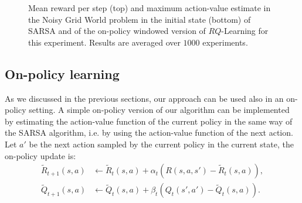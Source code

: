 \begin{figure}[t]
\begin{minipage}{\columnwidth}
\end{minipage}
  \caption[Grid World with Holes algorithms comparison - 2]{Mean reward per step (top) and maximum action-value estimate in the Noisy Grid World problem in the initial state (bottom) of SARSA and of the on-policy windowed version of $RQ$-Learning for this experiment. Results are averaged over $1000$ experiments.}
  \label{F:sarsa}
\end{figure}

\subsection{On-policy learning}
As we discussed in the previous sections, our approach can be used also in an on-policy setting. A simple on-policy version of our algorithm can be implemented by estimating the action-value function of the current policy in the same way of the SARSA algorithm, i.e. by using the action-value function of the next action. Let $a'$ be the next action sampled by the current policy in the current state, the on-policy update is:
\begin{align*}
\tilde{R}_{t+1}(s,a) & \leftarrow\tilde{R}_t(s,a)+\alpha_t(R(s,a,s')-\tilde{R}_t(s,a)),\\
\tilde{Q}_{t+1}(s,a) & \leftarrow\tilde{Q}_t(s,a)+\beta_t(Q_t(s',a')-\tilde{Q}_t(s,a)).
\end{align*}

